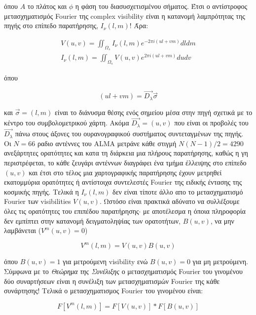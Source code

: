 όπου $A$ το πλάτος και $\phi$ η φάση του διασυσχετισμένου σήματος. Έτσι ο αντίστροφος μετασχηματισμός {\en Fourier} της {\en complex visibility} είναι η κατανομή λαμπρότητας της πηγής στο επίπεδο παρατήρησης, $I_{\nu}(l,m)$! Άρα:

\begin{align}
V(u,v) = \iint_{\Omega_s} I_{\nu}(l,m)e^{-2\pi i(ul+vm)} dldm\\
I_{\nu}(l,m) = \iint_{\Omega_s} V(u,v)e^{2\pi i(ul+vm)} dudv
\end{align}

όπου

\begin{equation}
(ul+vm) = \vec{D_{\lambda}} \vec{\sigma}
\end{equation}


και $\vec{\sigma}=(l,m)$ είναι το διάνυσμα θέσης ενός σημείου μέσα στην πηγή σχετικά με το κέντρο του συμβολομετρικού χάρτη. Ακόμα $\vec{D_{\lambda}} = (u,v)$ που είναι οι προβολές του $\vec{D_{\lambda}}$ πάνω στους άξονες του ουρανογραφικού συστήματος συντεταγμένων της πηγής. Οι $Ν=66$ ραδιο αντέννες του {\en ALMA} μετράνε κάθε στιγμή $Ν(Ν-1)/2=4290$ ανεξάρτητες ορατότητες και κατα τη διάρκεια μια πλήρους παρατήρησης, καθώς η γη περιστρέφεται, το κάθε ζευγάρι αντέννων διαγράφει ένα τμήμα έλλειψης στο επίπεδο $(u,v)$ και έτσι στο τέλος μια χαρτογραφικής παρατήρησης έχουν μετρηθεί εκατομμύρια ορατότητες ή αντίστοιχα συντελεστές {\en Fourier} της ειδικής έντασης της κοσμικής πηγής.  Τελικά η $I_{\nu}(l,m)$ δεν είναι τίποτε άλλο απο το μετασχηματισμό {\en Fourier} των {\en visibilities} $V(u,v)$. Ωστόσο είναι πρακτικά αδύνατο να συλλέξουμε όλες τις ορατότητες του επιπέδου παρατήρησης$\cdot$ με αποτέλεσμα η όποια πληροφορία δεν εμπίπτει στην κατανομή δειγματοληψίας των ορατοτήτων, $B(u,v)$, να μην λαμβάνεται ($V^{m}(u,v)=0$)

\begin{equation}
V^{m} (l,m) =  V(u,v)Β(u,v)
\end{equation}

όπου $Β(u,v)=1$ για μετρούμενη {\en visibility} ενώ $Β(u,v)=0$ για μη μετρούμενη. Σύμφωνα με το {\it Θεώρημα της Συνέλιξης} ο μετασχηματισμός {\en Fourier} του γινομένου δύο συναρτήσεων είναι η συνέλιξη των μετασχηματισμών {\en Fourier} της κάθε συνάρτησης\cite[{\en Appendix A.7}]{condon2016essential}! Τελικά ο μετασχηματισμος {\en Fourier} του γινομένου είναι: 

\begin{equation}\label{InverFourierDirtyIMage}
F[V^{m}(l,m)] =  F[V(u,v)]*F[Β(u,v)]
\end{equation}

